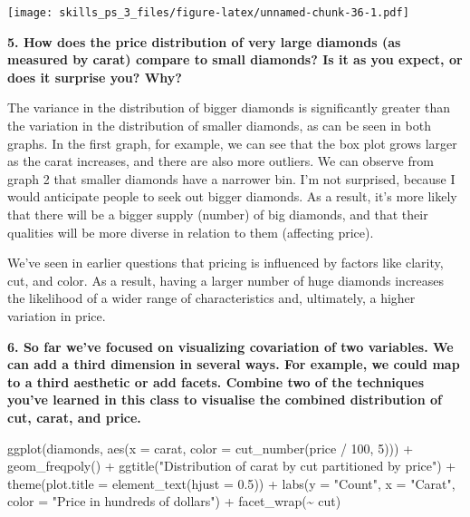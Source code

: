 \documentclass[
]{article}
\newenvironment{Shaded}{\begin{snugshade}}{\end{snugshade}}
\newcommand{\AttributeTok}[1]{\textcolor[rgb]{0.77,0.63,0.00}{#1}}
\newcommand{\DecValTok}[1]{\textcolor[rgb]{0.00,0.00,0.81}{#1}}
\newcommand{\FloatTok}[1]{\textcolor[rgb]{0.00,0.00,0.81}{#1}}
\newcommand{\FunctionTok}[1]{\textcolor[rgb]{0.00,0.00,0.00}{#1}}
\newcommand{\NormalTok}[1]{#1}
\newcommand{\SpecialCharTok}[1]{\textcolor[rgb]{0.00,0.00,0.00}{#1}}
\newcommand{\StringTok}[1]{\textcolor[rgb]{0.31,0.60,0.02}{#1}}
\begin{document}
\texttt{[image: skills\_ps\_3\_files/figure-latex/unnamed-chunk-36-1.pdf]}

\textbf{5. How does the price distribution of very large diamonds (as
measured by carat) compare to small diamonds? Is it as you expect, or
does it surprise you? Why?}

The variance in the distribution of bigger diamonds is significantly
greater than the variation in the distribution of smaller diamonds, as
can be seen in both graphs. In the first graph, for example, we can see
that the box plot grows larger as the carat increases, and there are
also more outliers. We can observe from graph 2 that smaller diamonds
have a narrower bin. I'm not surprised, because I would anticipate
people to seek out bigger diamonds. As a result, it's more likely that
there will be a bigger supply (number) of big diamonds, and that their
qualities will be more diverse in relation to them (affecting price).

We've seen in earlier questions that pricing is influenced by factors
like clarity, cut, and color. As a result, having a larger number of
huge diamonds increases the likelihood of a wider range of
characteristics and, ultimately, a higher variation in price.

\textbf{6. So far we've focused on visualizing covariation of two
variables. We can add a third dimension in several ways. For example, we
could map to a third aesthetic or add facets. Combine two of the
techniques you've learned in this class to visualise the combined
distribution of cut, carat, and price.}

\begin{Shaded}
\begin{Highlighting}[]
\FunctionTok{ggplot}\NormalTok{(diamonds, }\FunctionTok{aes}\NormalTok{(}\AttributeTok{x =}\NormalTok{ carat, }\AttributeTok{color =} \FunctionTok{cut\_number}\NormalTok{(price }\SpecialCharTok{/} \DecValTok{100}\NormalTok{, }\DecValTok{5}\NormalTok{))) }\SpecialCharTok{+}
  \FunctionTok{geom\_freqpoly}\NormalTok{() }\SpecialCharTok{+}
  \FunctionTok{ggtitle}\NormalTok{(}\StringTok{"Distribution of carat by cut partitioned by price"}\NormalTok{) }\SpecialCharTok{+}
  \FunctionTok{theme}\NormalTok{(}\AttributeTok{plot.title =} \FunctionTok{element\_text}\NormalTok{(}\AttributeTok{hjust =} \FloatTok{0.5}\NormalTok{)) }\SpecialCharTok{+}
  \FunctionTok{labs}\NormalTok{(}\AttributeTok{y =} \StringTok{"Count"}\NormalTok{, }\AttributeTok{x =} \StringTok{"Carat"}\NormalTok{, }\AttributeTok{color =} \StringTok{"Price in hundreds of dollars"}\NormalTok{) }\SpecialCharTok{+}
  \FunctionTok{facet\_wrap}\NormalTok{(}\SpecialCharTok{\textasciitilde{}}\NormalTok{ cut)}
\end{Highlighting}
\end{Shaded}
\end{document}
